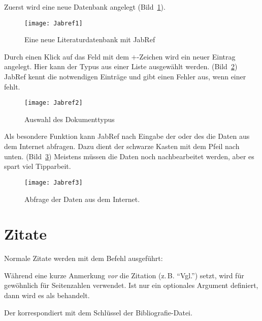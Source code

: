 Zuerst wird eine neue Datenbank angelegt (Bild~\ref{fig:lis:jabref1}).

\begin{figure}
  \texttt{[image: Jabref1]}
  \caption{Eine neue Literaturdatenbank mit JabRef}
  \label{fig:lis:jabref1}
\end{figure}

Durch einen Klick auf das Feld mit dem $+$-Zeichen wird ein neuer Eintrag angelegt.
Hier kann der Typus aus einer Liste ausgewählt werden. (Bild~\ref{fig:lis:jabref2})
JabRef kennt die notwendigen Einträge und gibt einen Fehler aus, wenn einer fehlt.

\begin{figure}
  \texttt{[image: Jabref2]}
  \caption{Auswahl des Dokumenttypus}
  \label{fig:lis:jabref2}
\end{figure}

Als besondere Funktion kann JabRef nach Eingabe der  oder des  die Daten
aus dem Internet abfragen. Dazu dient der schwarze Kasten mit dem Pfeil nach unten. (Bild~\ref{fig:lis:jabref3})
Meistens müssen die Daten noch nachbearbeitet werden, aber es spart viel Tipparbeit.

\begin{figure}
  \texttt{[image: Jabref3]}
  \caption{Abfrage der Daten aus dem Internet.}
  \label{fig:lis:jabref3}
\end{figure}

\section{Zitate}\label{sec:zitate}\label{lit:cite-befehle}

Normale Zitate werden mit dem Befehl  ausgeführt:

Während   eine kurze Anmerkung \emph{vor} die Zitation (z.\,B. \enquote{Vgl.}) setzt, 
wird   für gewöhnlich für Seitenzahlen verwendet.
Ist nur ein optionales Argument definiert, 
dann wird es als  behandelt.
Der  korrespondiert mit dem Schlüssel der Bibliografie-Datei.

